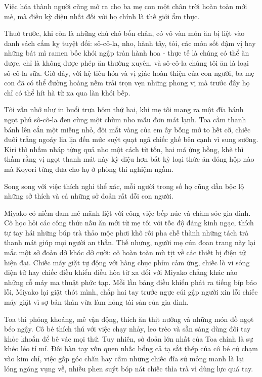 \documentclass[../main.tex]{subfiles}
\begin{document}
Việc hóa thành người cũng mở ra cho ba mẹ con một chân trời hoàn toàn mới mẻ, mà điều kỳ diệu nhất đối với họ chính là thế giới ẩm thực.

Thuở trước, khi còn là những chú chó bốn chân, có vô vàn món ăn bị liệt vào danh sách cấm kỵ tuyệt đối: sô-cô-la, nho, hành tây, tỏi, các món sốt đậm vị hay những bát mì ramen bốc khói ngập tràn hành hoa - thực tế là chúng có thể ăn được, chỉ là không được phép ăn thường xuyên, và sô-cô-la chúng tôi ăn là loại sô-cô-la sữa. Giờ đây, với hệ tiêu hóa và vị giác hoàn thiện của con người, ba mẹ con đã có thể đường hoàng nếm trải trọn vẹn những phong vị mà trước đây họ chỉ có thể hít hà từ xa qua làn khói bếp.

Tôi vẫn nhớ như in buổi trưa hôm thứ hai, khi mẹ tôi mang ra một đĩa bánh ngọt phủ sô-cô-la đen cùng một chùm nho mẫu đơn mát lạnh. Toa cầm thanh bánh lên cắn một miếng nhỏ, đôi mắt vàng của em ấy bỗng mở to hết cỡ, chiếc đuôi trắng ngoáy lia lịa đến mức suýt quạt ngã chiếc ghế bên cạnh vì sung sướng. Kiri thì nhấm nháp từng quả nho một cách từ tốn, hai má ửng hồng, khẽ thì thầm rằng vị ngọt thanh mát này kỳ diệu hơn bất kỳ loại thức ăn đóng hộp nào mà Koyori từng đưa cho họ ở phòng thí nghiệm ngầm.

Song song với việc thích nghi thể xác, mỗi người trong số họ cũng dần bộc lộ những sở thích và cả những sở đoản rất đỗi con người.

Miyako có niềm đam mê mãnh liệt với công việc bếp núc và chăm sóc gia đình. Cô học hỏi các công thức nấu ăn mới từ mẹ tôi với tốc độ đáng kinh ngạc, thích tự tay hái những búp trà thảo mộc phơi khô rồi pha chế thành những tách trà thanh mát giúp mọi người an thần. Thế nhưng, người mẹ cún đoan trang này lại mắc một sở đoản dở khóc dở cười: cô hoàn toàn mù tịt về các thiết bị điện tử hiện đại. Chiếc máy giặt tự động với hàng chục phím cảm ứng, chiếc lò vi sóng điện tử hay chiếc điều khiển điều hòa từ xa đối với Miyako chẳng khác nào những cỗ máy ma thuật phức tạp. Mỗi lần bảng điều khiển phát ra tiếng bíp báo lỗi, Miyako lại giật thót mình, chắp hai tay trước ngực cúi gập người xin lỗi chiếc máy giặt vì sợ bản thân vừa làm hỏng tài sản của gia đình.

Toa thì phóng khoáng, mê vận động, thích ăn thịt nướng và những món đồ ngọt béo ngậy. Cô bé thích thú với việc chạy nhảy, leo trèo và sẵn sàng dùng đôi tay khỏe khoắn để bê vác mọi thứ. Tuy nhiên, sở đoản lớn nhất của Toa chính là sự khéo léo tỉ mỉ. Đôi bàn tay vốn quen nhấc bổng cả tạ sắt thép của cô bé cứ chạm vào kim chỉ, việc gấp góc chăn hay cầm những chiếc đĩa sứ mỏng manh là lại lóng ngóng vụng về, nhiều phen suýt bóp nát chiếc thìa trà vì dùng lực quá tay.
\end{document}
